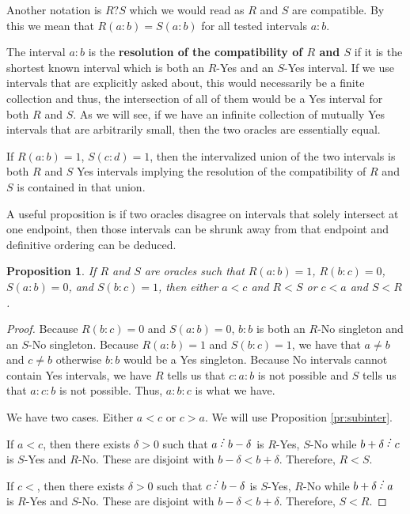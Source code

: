 \documentclass[12pt]{article}
\newtheorem{proposition}{Proposition}[subsection]
\begin{document}
Another notation is $R?S$ which we would read as $R$ and $S$ are compatible. By this we mean that $R(a:b) = S(a:b)$ for all tested intervals $a:b$. 

The interval $a:b$ is the \textbf{resolution of the compatibility of $R$ and $S$} if it is the shortest known interval which is both an $R$-Yes and an $S$-Yes interval. If we use intervals that are explicitly asked about, this would necessarily be a finite collection and thus, the intersection of all of them would be a Yes interval for both $R$ and $S$. As we will see, if we have an infinite collection of mutually Yes intervals that are arbitrarily small, then the two oracles are essentially equal. 

If $R(a:b) = 1$, $S(c:d) = 1$, then the intervalized union of the two intervals is both $R$ and $S$ Yes intervals implying the resolution of the compatibility of $R$ and $S$ is contained in that union.

A useful proposition is if two oracles disagree on intervals that solely intersect at one endpoint, then those intervals can be shrunk away from that endpoint and definitive ordering can be deduced. 

\begin{proposition}
    If $R$ and $S$ are oracles such that $R(a:b)=1$, $R(b:c)=0$, $S(a:b) = 0$, and $S(b:c)=1$, then either $a < c$ and $R < S$ or $c < a$ and $S < R$.
\end{proposition}

\begin{proof}
    Because $R(b:c) = 0$ and $S(a:b)=0$, $b:b$ is both an $R$-No singleton and an $S$-No singleton. Because $R(a:b)=1$ and $S(b:c)=1$, we have that $a \neq b$ and $c \neq b$ otherwise $b:b$ would be a Yes singleton. Because No intervals cannot contain Yes intervals, we have $R$ tells us that $c:a:b$ is not possible and $S$ tells us that $a:c:b$ is not possible. Thus, $a:b:c$ is what we have. 

    We have two cases. Either $a<c$ or $c>a$. We will use Proposition \ref{pr:subinter}.

    If $a<c$, then there exists $\delta > 0$ such that $a \lte b-\delta$ is $R$-Yes, $S$-No while $b+\delta \lte c$ is $S$-Yes and $R$-No. These are disjoint with $b-\delta < b + \delta$. Therefore, $R < S$.

    If $c<$, then there exists $\delta > 0$ such that $c \lte b-\delta$ is $S$-Yes, $R$-No while $b+\delta \lte a$ is $R$-Yes and $S$-No. These are disjoint with $b-\delta < b + \delta$. Therefore, $S < R$.
\end{proof}
\end{document}
